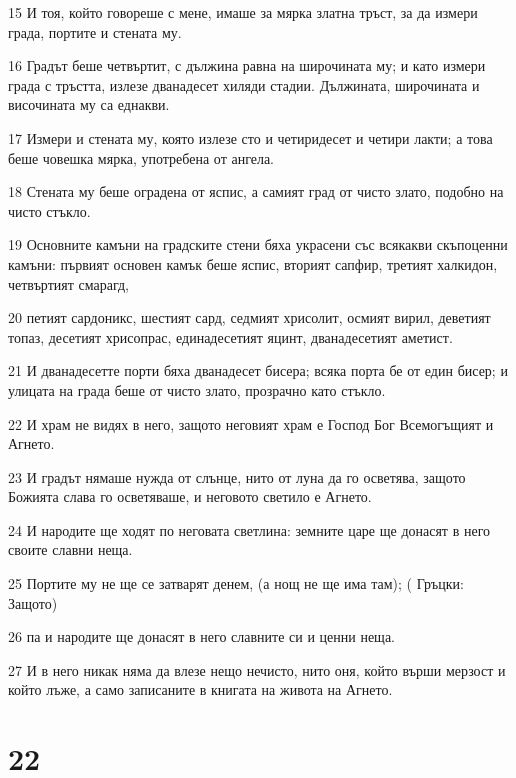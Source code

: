 \par 15 И тоя, който говореше с мене, имаше за мярка златна тръст, за да измери града, портите и стената му.
\par 16 Градът беше четвъртит, с дължина равна на широчината му; и като измери града с тръстта, излезе дванадесет хиляди стадии. Дължината, широчината и височината му са еднакви.
\par 17 Измери и стената му, която излезе сто и четиридесет и четири лакти; а това беше човешка мярка, употребена от ангела.
\par 18 Стената му беше оградена от яспис, а самият град от чисто злато, подобно на чисто стъкло.
\par 19 Основните камъни на градските стени бяха украсени със всякакви скъпоценни камъни: първият основен камък беше яспис, вторият сапфир, третият халкидон, четвъртият смарагд,
\par 20 петият сардоникс, шестият сард, седмият хрисолит, осмият вирил, деветият топаз, десетият хрисопрас, единадесетият яцинт, дванадесетият аметист.
\par 21 И дванадесетте порти бяха дванадесет бисера; всяка порта бе от един бисер; и улицата на града беше от чисто злато, прозрачно като стъкло.
\par 22 И храм не видях в него, защото неговият храм е Господ Бог Всемогъщият и Агнето.
\par 23 И градът нямаше нужда от слънце, нито от луна да го осветява, защото Божията слава го осветяваше, и неговото светило е Агнето.
\par 24 И народите ще ходят по неговата светлина: земните царе ще донасят в него своите славни неща.
\par 25 Портите му не ще се затварят денем, (а нощ не ще има там); ( Гръцки: Защото)
\par 26 па и народите ще донасят в него славните си и ценни неща.
\par 27 И в него никак няма да влезе нещо нечисто, нито оня, който върши мерзост и който лъже, а само записаните в книгата на живота на Агнето.

\chapter{22}

